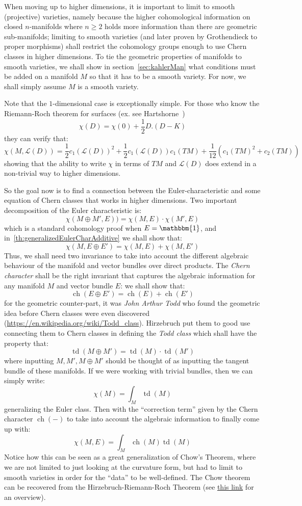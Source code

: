 \documentclass{book}
\newcommand{\CL}{{\mathcal{L}}}
\newcommand{\ch}{{\operatorname{ch}}}
\newcommand{\td}{{\operatorname{td}}}
\renewcommand{\ch}{{\operatorname{ch}}}
\begin{document}
When moving up to higher dimensions, it is important to limit to smooth (projective) varieties, namely because the higher
cohomological information on closed $n$-manifolds where $n\ge 2$ holds more information than there are
geometric sub-manifolds; limiting to smooth varieties (and later proven by Grothendieck to proper
morphisms) shall restrict the cohomology groups enough to use Chern classes in higher dimensions. To tie the
geometric properties of manifolds to smooth varieties, we shall show in section~\ref{sec:kahlerMan} what
conditions must be added on a manifold $M$ so that it has to be a smooth variety. For now, we shall simply
assume $M$ is a smooth variety.

Note that the $1$-dimensional case is exceptionally simple. For those who know the Riemann-Roch theorem for
surfaces (ex. see Hartshorne~\cite[chapter~5.1, theorem~1.6]{hartshorneAlgebraicGeometry2013})
\[
\chi(D) = \chi(0) + \frac{1}{2}D.(D-K)
\]
they can verify that:
\[
  \chi(M, \CL(D)) =\frac{1}{2}c_1(\CL(D))^2 + \frac{1}{2}c_1(\CL(D))c_1(TM) + \frac{1}{12}(c_1(TM)^2 + c_2(TM))
\]
showing that the ability to write $\chi$ in terms of $TM$ and $\CL(D)$ does extend in a non-trivial way to higher
dimensions.

So the goal now is to find a connection between the Euler-characteristic and some equation of Chern classes
that works in higher dimensions. Two important decomposition of the Euler characteristic is:
\[
  \chi(M\oplus M', E)) = \chi(M, E)\cdot \chi(M', E)
\]
which is a standard cohomology proof when $E = \mathbbm{1}$, and in~\cref{th:generalizedEulerCharAdditive} we shall show that:
\[
  \chi(M, E\oplus E') = \chi(M, E) + \chi(M, E')
\]
Thus, we shall need two invariance to take into account the different algebraic behaviour of the manifold and
vector bundles over direct products. The \emph{Chern character} shall be the right invariant that captures the
algebraic information for any manifold $M$ and vector bundle $E$: we shall show that:
\[
  \ch(E\oplus E') = \ch(E) + \ch(E')
\]
for the geometric counter-part, it was \emph{John Arthur Todd} who found
the geometric idea before Chern classes were even discovered
(\url{https://en.wikipedia.org/wiki/Todd_class}). Hirzebruch put them to good use connecting
them to Chern classes in defining the \emph{Todd class} which shall have the property that:
\[
  \td(M\oplus M') = \td(M)\cdot \td(M')
\]
where inputting $M, M', M\oplus M'$ should be thought of as inputting the tangent bundle of these manifolds.
If we were working with trivial bundles, then we can simply write:
\[
  \chi(M) = \int_M \td(M)
\]
generalizing the Euler class. Then with the ``correction term'' given by the Chern character $\ch(-)$ to take
into account the algebraic information to finally come up with:
\[
  \chi(M,E) = \int_M \ch(M)\td(M)
\]
Notice how this can be seen as a great generalization of Chow's Theorem, where we are not limited to just
looking at the curvature form, but had to limit to smooth varieties in order for the ``data'' to be
well-defined. The Chow theorem can be recovered
from the Hirzebruch-Riemann-Roch Theorem (see \href{https://mathoverflow.net/questions/73450/top-chern-class-euler-characteristic}{this link} for an
overview).
\end{document}
